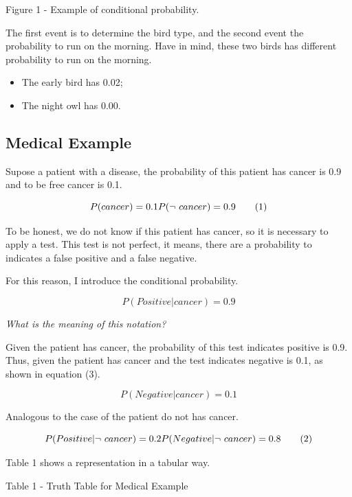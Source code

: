 \documentclass[]{book}
\providecommand{\tightlist}{%
  \setlength{\itemsep}{0pt}\setlength{\parskip}{0pt}}
\begin{document}
Figure 1 - Example of conditional probability.

The first event is to determine the bird type, and the second event the
probability to run on the morning. Have in mind, these two birds has
different probability to run on the morning.

\begin{itemize}
\tightlist
\item
  The early bird has 0.02;
\item
  The night owl has 0.00.
\end{itemize}

\subsection{Medical Example}\label{medical-example}

Supose a patient with a disease, the probability of this patient has
cancer is 0.9 and to be free cancer is 0.1.

\[P(cancer) = 0.1 \\
  P(\neg \ cancer) = 0.9 \tag{1}\]

To be honest, we do not know if this patient has cancer, so it is
necessary to apply a test. This test is not perfect, it means, there are
a probability to indicates a false positive and a false negative.

For this reason, I introduce the conditional probability.

\[ P(Positive | cancer) = 0.9 \tag{2}\]

\emph{What is the meaning of this notation?}

Given the patient has cancer, the probability of this test indicates
positive is 0.9. Thus, given the patient has cancer and the test
indicates negative is 0.1, as shown in equation (3).

\[ P(Negative | cancer) = 0.1 \tag{3}\]

Analogous to the case of the patient do not has cancer.

\[ P(Positive | \neg \ cancer) = 0.2 \\
   P(Negative | \neg \ cancer) = 0.8 \tag{2} \]

Table 1 shows a representation in a tabular way.

Table 1 - Truth Table for Medical Example
\end{document}
